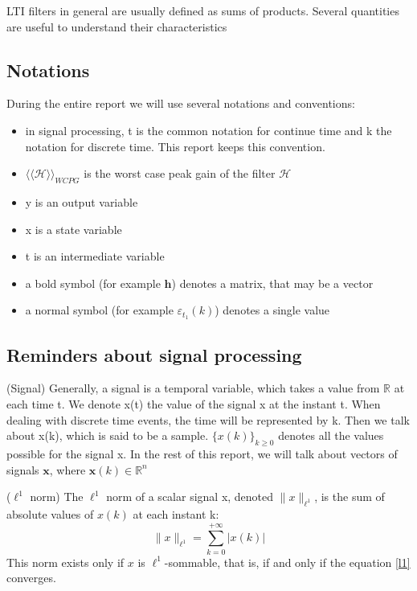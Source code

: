 	LTI filters in general are usually defined as sums of products.
	Several quantities are useful to understand their characteristics

	\subsection{Notations}
		During the entire report we will use several notations and conventions:
		\begin{itemize}
			\item in signal processing, t is the common notation for continue time and k the notation for discrete time. This report keeps this convention.
			\item $\langle\langle\mathcal{H}\rangle\rangle _{WCPG}$ is the worst case peak gain of the filter $\mathcal{H}$
			\item y is an output variable
			\item x is a state variable
			\item t is an intermediate variable
			\item a bold symbol (for example $\boldsymbol{h}$) denotes a matrix, that may be a vector
			\item a normal symbol (for example $\varepsilon_{t_1}(k)$) denotes a single value
		\end{itemize}

	\subsection{Reminders about signal processing}
	\begin{thdef}\label{sig} (Signal)
		Generally, a signal is a temporal variable, which takes a value from $\mathbb{R}$ at each time t.
		We denote x(t) the value of the signal x at the instant t.
		When dealing with discrete time events, the time will be represented by k.
		Then we talk about x(k), which is said to be a sample.
		$\{x(k)\}_{k \geq 0}$ denotes all the values possible for the signal x.
		In the rest of this report, we will talk about vectors of signals $\textbf{x}$, where $\textbf{x}(k) \in \mathbb{R}^{n}$
	\end{thdef}

	\begin{thdef}\label{l_1} ($\ell^1$ norm)
		The $\ell^1$ norm of a scalar signal x, denoted $\|x\|_{\ell^1}$, is the sum of absolute values of $x(k)$ at each instant k:
		\begin{equation} \label{l1}
				\|x\|_{\ell^1}=\sum_{k=0}^{+\infty}|x(k)|
		\end{equation}
		This norm exists only if $x$ is $\ell^1$-sommable, that is, if and only if the equation \ref{l1} converges.
	\end{thdef}
	
